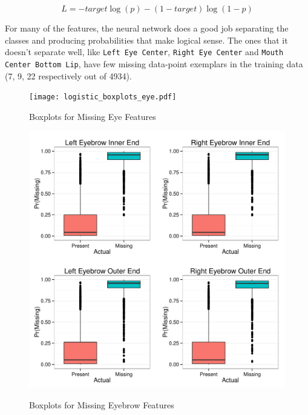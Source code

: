 \documentclass[conference]{IEEEtran}
\begin{document}
\[\label{eq:bin_cross}
 L = -target \log(p) - (1 - target) \log(1 - p)
\]

For many of the features, the neural network does a good job separating the classes and producing probabilities that make logical sense.  The ones that it doesn't separate well, like \texttt{Left Eye Center}, \texttt{Right Eye Center} and \texttt{Mouth Center Bottom Lip}, have few missing data-point exemplars in the training data (7, 9, 22 respectively out of 4934).

\begin{figure}[!ht]
  \centering
  \caption{Boxplots for Missing Eye Features}
  \texttt{[image: logistic\_boxplots\_eye.pdf]}
  \label{fig:logistic_boxplots_eye}
\end{figure}

\begin{figure}[!ht]
  \centering
  \caption{Boxplots for Missing Eyebrow Features}
  \includegraphics[scale=.5]{logistic_boxplots_eyebrow.pdf}
  \label{fig:logistic_boxplots_eyebrow}
\end{figure}
\end{document}
